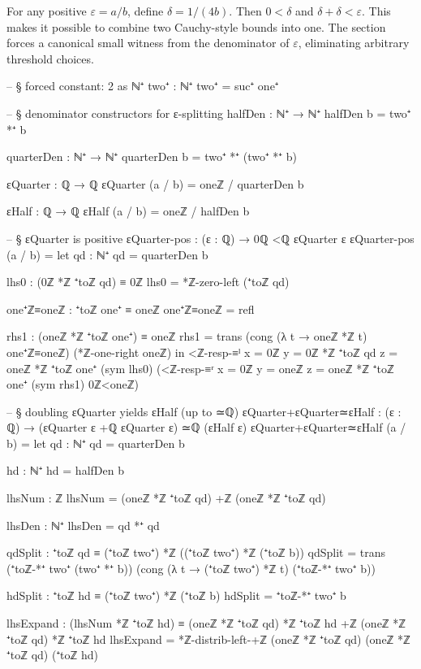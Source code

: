 \documentclass[11pt,a4paper]{book}
\begin{document}
For any positive $\varepsilon = a/b$, define
$\delta = 1/(4b)$.  Then $0 < \delta$ and $\delta + \delta < \varepsilon$.
This makes it possible to combine two Cauchy-style bounds into one.  The
section forces a canonical small witness from the denominator of
$\varepsilon$, eliminating arbitrary threshold choices.

\begin{code}
-- § forced constant: 2 as ℕ⁺
two⁺ : ℕ⁺
two⁺ = suc⁺ one⁺

-- § denominator constructors for ε-splitting
halfDen : ℕ⁺ → ℕ⁺
halfDen b = two⁺ *⁺ b

quarterDen : ℕ⁺ → ℕ⁺
quarterDen b = two⁺ *⁺ (two⁺ *⁺ b)

εQuarter : ℚ → ℚ
εQuarter (a / b) = oneℤ / quarterDen b

εHalf : ℚ → ℚ
εHalf (a / b) = oneℤ / halfDen b

-- § εQuarter is positive
εQuarter-pos : (ε : ℚ) → 0ℚ <ℚ εQuarter ε
εQuarter-pos (a / b) =
  let
    qd : ℕ⁺
    qd = quarterDen b

    lhs0 : (0ℤ *ℤ ⁺toℤ qd) ≡ 0ℤ
    lhs0 = *ℤ-zero-left (⁺toℤ qd)

    one⁺ℤ≡oneℤ : ⁺toℤ one⁺ ≡ oneℤ
    one⁺ℤ≡oneℤ = refl

    rhs1 : (oneℤ *ℤ ⁺toℤ one⁺) ≡ oneℤ
    rhs1 = trans (cong (λ t → oneℤ *ℤ t) one⁺ℤ≡oneℤ) (*ℤ-one-right oneℤ)
  in
  <ℤ-resp-≡ˡ {x = 0ℤ} {y = 0ℤ *ℤ ⁺toℤ qd} {z = oneℤ *ℤ ⁺toℤ one⁺} (sym lhs0)
    (<ℤ-resp-≡ʳ {x = 0ℤ} {y = oneℤ} {z = oneℤ *ℤ ⁺toℤ one⁺} (sym rhs1) 0ℤ<oneℤ)

-- § doubling εQuarter yields εHalf (up to ≃ℚ)
εQuarter+εQuarter≃εHalf : (ε : ℚ) → (εQuarter ε +ℚ εQuarter ε) ≃ℚ (εHalf ε)
εQuarter+εQuarter≃εHalf (a / b) =
  let
    qd : ℕ⁺
    qd = quarterDen b

    hd : ℕ⁺
    hd = halfDen b

    lhsNum : ℤ
    lhsNum = (oneℤ *ℤ ⁺toℤ qd) +ℤ (oneℤ *ℤ ⁺toℤ qd)

    lhsDen : ℕ⁺
    lhsDen = qd *⁺ qd

    qdSplit : ⁺toℤ qd ≡ (⁺toℤ two⁺) *ℤ ((⁺toℤ two⁺) *ℤ (⁺toℤ b))
    qdSplit =
      trans
        (⁺toℤ-*⁺ two⁺ (two⁺ *⁺ b))
        (cong (λ t → (⁺toℤ two⁺) *ℤ t) (⁺toℤ-*⁺ two⁺ b))

    hdSplit : ⁺toℤ hd ≡ (⁺toℤ two⁺) *ℤ (⁺toℤ b)
    hdSplit = ⁺toℤ-*⁺ two⁺ b

    lhsExpand : (lhsNum *ℤ ⁺toℤ hd) ≡ (oneℤ *ℤ ⁺toℤ qd) *ℤ ⁺toℤ hd +ℤ (oneℤ *ℤ ⁺toℤ qd) *ℤ ⁺toℤ hd
    lhsExpand =
      *ℤ-distrib-left-+ℤ (oneℤ *ℤ ⁺toℤ qd) (oneℤ *ℤ ⁺toℤ qd) (⁺toℤ hd)


\end{code}
\end{document}
